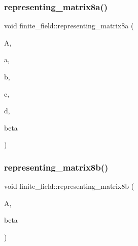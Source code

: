 \mbox{\label{classfinite__field_aa1014121c2fd9b0d1ab9f0e042f24bc3}} 
\subsubsection{\texorpdfstring{representing\+\_\+matrix8a()}{representing\_matrix8a()}}
{\footnotesize\ttfamily void finite\+\_\+field\+::representing\+\_\+matrix8a (\begin{DoxyParamCaption}\item[{\mbox{\hyperlink{galois_8h_a09fddde158a3a20bd2dcadb609de11dc}{I\+NT}} $\ast$}]{A,  }\item[{\mbox{\hyperlink{galois_8h_a09fddde158a3a20bd2dcadb609de11dc}{I\+NT}}}]{a,  }\item[{\mbox{\hyperlink{galois_8h_a09fddde158a3a20bd2dcadb609de11dc}{I\+NT}}}]{b,  }\item[{\mbox{\hyperlink{galois_8h_a09fddde158a3a20bd2dcadb609de11dc}{I\+NT}}}]{c,  }\item[{\mbox{\hyperlink{galois_8h_a09fddde158a3a20bd2dcadb609de11dc}{I\+NT}}}]{d,  }\item[{\mbox{\hyperlink{galois_8h_a09fddde158a3a20bd2dcadb609de11dc}{I\+NT}}}]{beta }\end{DoxyParamCaption})}

\mbox{\label{classfinite__field_a4c65c5cec02ac4ab937a0d75754ffd1a}} 
\subsubsection{\texorpdfstring{representing\+\_\+matrix8b()}{representing\_matrix8b()}}
{\footnotesize\ttfamily void finite\+\_\+field\+::representing\+\_\+matrix8b (\begin{DoxyParamCaption}\item[{\mbox{\hyperlink{galois_8h_a09fddde158a3a20bd2dcadb609de11dc}{I\+NT}} $\ast$}]{A,  }\item[{\mbox{\hyperlink{galois_8h_a09fddde158a3a20bd2dcadb609de11dc}{I\+NT}}}]{beta }\end{DoxyParamCaption})}

